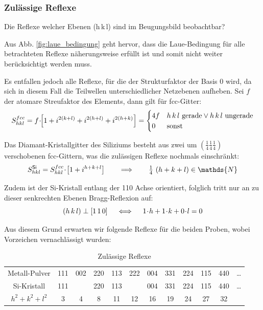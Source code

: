 \subsubsection{Zulässige Reflexe}
Die Reflexe welcher Ebenen (h\,k\,l) sind im Beugungsbild beobachtbar?

Aus Abb. \ref{fig:laue_bedingung} geht hervor, dass die Laue-Bedingung für alle betrachteten Reflexe näherungsweise erfüllt ist und somit nicht weiter berücksichtigt werden muss.

Es entfallen jedoch alle Reflexe, für die der Strukturfaktor der Basis 0 wird, da sich in diesem Fall die Teilwellen unterschiedlicher Netzebenen aufheben. Sei $f$ der atomare Streufaktor des Elements, dann gilt für fcc-Gitter:
\begin{equation}
S_{hkl}^{fcc} = f \!\cdot\!\! \left[1 + i^{2(k+l)} +  i^{2(h+l)} +  i^{2(h+k)} \right] =
\begin{cases}
4 f	& h\,k\,l \text{ gerade} \lor h\,k\,l \text{ ungerade}\\
0	& \text{sonst}
\end{cases}
\end{equation}

Das Diamant-Kristallgitter des Siliziums besteht aus zwei um $(\frac14 \frac14 \frac14)$ verschobenen fcc-Gittern, was die zulässigen Reflexe nochmals einschränkt:
\begin{equation}
S_{hkl}^\mathsf{Si} =  S_{hkl}^{fcc} \cdt \left[1 + i^{h+k+l} \right] \somit \tfrac14 ~ (h+k+l) \in \mathds{N}
\end{equation}

Zudem ist der \textsf{Si}-Kristall entlang der 110 Achse orientiert, folglich tritt nur an zu dieser senkrechten Ebenen Bragg-Reflexion auf:
\begin{equation}
(h\,k\,l) \perp [1\,1\,0]		\quad\iff\quad	1 \!\cdot\! h + 1 \!\cdot\! k + 0 \!\cdot\! l = 0
\end{equation}

Aus diesem Grund erwarten wir folgende Reflexe für die beiden Proben, wobei Vorzeichen vernachlässigt wurden:

\begin{table}[h]
\caption{Zulässige Reflexe}
\begin{tabular}{*{12}c}
	\toprule
	Metall-Pulver		& 111	& 002	& 220	& 113	& 222	& 004	& 331	& 224	& 115	& 440	& \dots	\\
	\textsf{Si}-Kristall	& 111	&		& 220	& 113	&		& 004	& 331	& 224	& 115	& 440	&  \dots	\\
	\midrule
	$h^2 + k^2 + l^2$	& 3		& 4		& 8		& 11		& 12		& 16		& 19		& 24		& 27		& 32 \\
	\bottomrule
\end{tabular}
\end{table}


